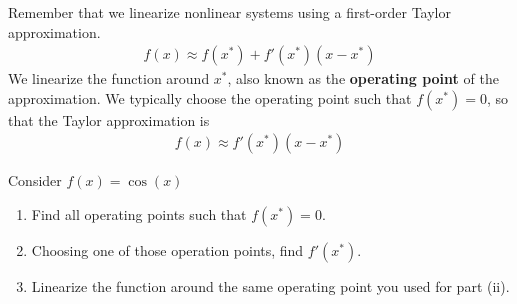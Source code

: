 

Remember that we linearize nonlinear systems using a first-order Taylor approximation.
\begin{align}
f(x) \approx f(x^{*}) + f'(x^{*})(x - x^{*})
\end{align}
We linearize the function around $x^{*}$, also known as the \textbf{operating point} of the approximation.
We typically choose the operating point such that $f(x^{*}) = 0$, so that the Taylor approximation is
\begin{align}
f(x) \approx f'(x^{*})(x - x^{*})
\end{align}

\begin{enumerate}
    \qitem Consider $f(x) = \cos(x)$
    \begin{enumerate}[label = (\roman*)]
        \item Find all operating points such that $f(x^{*}) = 0$.

        \item Choosing one of those operation points, find $f'(x^{*})$.

        \item Linearize the function around the same operating point you used for part (ii).
    \end{enumerate}


\end{enumerate}

